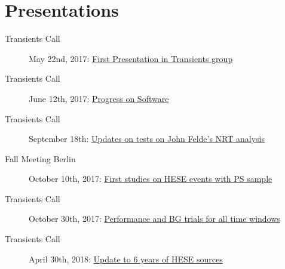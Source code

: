 \section{Presentations}
\begin{description}
  \item[Transients Call] May 22nd, 2017: \href{https://drive.google.com/file/d/0B_Gkg-MCR-1za1RMbjlzTFE0YVU/view}{First Presentation in Transients group}
  \item[Transients Call] June 12th, 2017: \href{https://drive.google.com/file/d/0B_Gkg-MCR-1zTFI3Umg3XzZrSE0/view}{Progress on Software}
  \item[Transients Call] September 18th: \href{https://drive.google.com/file/d/0B_Gkg-MCR-1zR28tTmhBT3VYTGs/view}{Updates on tests on John Felde's NRT analysis}
  \item[Fall Meeting Berlin] October 10th, 2017: \href{https://events.icecube.wisc.edu/getFile.py/access?contribId=37&sessionId=32&resId=0&materialId=slides&confId=90}{First studies on HESE events with PS sample}
  \item[Transients Call] October 30th, 2017: \href{https://drive.google.com/file/d/0B_Gkg-MCR-1zOFdkajczT3JWNUU/view}{Performance and BG trials for all time windows}
  \item[Transients Call] April 30th, 2018: \href{https://drive.google.com/file/d/12vOMOpt1nMrmnBdM_4wV5sMdg0FUJLqF/view}{Update to 6 years of HESE sources}
\end{description}

